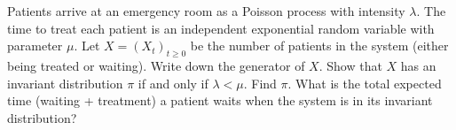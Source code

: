 \documentclass[10pt]{article}
\begin{document}
\maketitle

\begin{problem}[Exercise 5.1]
Patients arrive at an emergency room as a Poisson process with intensity \( \lambda \). The time to treat each patient is an independent exponential random variable with parameter \( \mu \). Let \( X= (X_t)_{t\geq 0} \) be the number of patients in the system (either being treated or waiting). Write down the generator of \( X \). Show that \( X \) has an invariant distribution \( \pi \) if and only if \( \lambda<\mu \). Find \( \pi \). What is the total expected time (waiting + treatment) a patient waits when the system is in its invariant distribution?
\end{problem}
\end{document}
